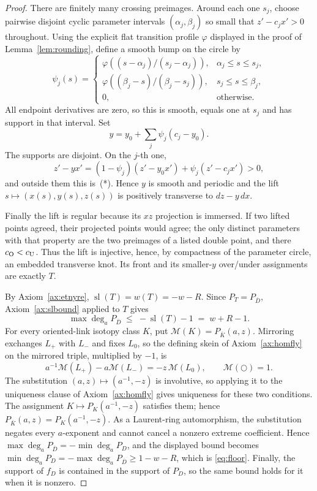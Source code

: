 \begin{proof}
There are finitely many crossing preimages.  Around each one $s_j$, choose
pairwise disjoint cyclic parameter intervals $(\alpha_j,\beta_j)$ so small that
$z'-c_jx'>0$ throughout.  Using the explicit flat transition profile
$\varphi$ displayed in the proof of Lemma~\ref{lem:rounding}, define a smooth
bump on the circle by
\[
 \psi_j(s)=
 \begin{cases}
 \varphi\!\left((s-\alpha_j)/(s_j-\alpha_j)\right),&
       \alpha_j\le s\le s_j,\\
 \varphi\!\left((\beta_j-s)/(\beta_j-s_j)\right),&
       s_j\le s\le\beta_j,\\
 0,&\text{otherwise}.
 \end{cases}
\]
All endpoint derivatives are zero, so this is smooth, equals one at $s_j$ and
has support in that interval.  Set
\[
 y=y_0+\sum_j\psi_j(c_j-y_0).
\]
The supports are disjoint.  On the $j$-th one,
\[
 z'-yx'=(1-\psi_j)(z'-y_0x')+\psi_j(z'-c_jx')>0,
\]
and outside them this is~(*).  Hence $y$ is smooth and periodic and the lift
$s\mapsto(x(s),y(s),z(s))$ is positively transverse to $dz-y\,dx$.

Finally the lift is regular because its $xz$ projection is immersed.  If two
lifted points agreed, their projected points would agree; the only distinct
parameters with that property are the two preimages of a listed double point,
and there $c_{\rm O}<c_{\rm U}$.  Thus the lift is injective, hence, by
compactness of the parameter circle, an embedded transverse knot.  Its front
and its smaller-$y$ over/under assignments are exactly $T$.

By Axiom~\ref{ax:etnyre}, $\operatorname{sl}(T)=w(T)=-w-R$. Since
$P_T=P_{\overline D}$, Axiom~\ref{ax:slbound} applied to $T$ gives
\[
\max\deg_a P_{\overline D}\;\leq\;-\operatorname{sl}(T)-1\;=\;w+R-1 .
\]
For every oriented-link isotopy class $K$, put
$\mathcal M(K)=P_{\overline K}(a,z)$. Mirroring exchanges $L_+$ with $L_-$
and fixes $L_0$, so the defining skein of Axiom~\ref{ax:homfly} on the
mirrored triple, multiplied by $-1$, is
\[
 a^{-1}\mathcal M(L_+)-a\mathcal M(L_-)=-z\,\mathcal M(L_0),
 \qquad \mathcal M(\bigcirc)=1.
\]
The substitution $(a,z)\mapsto(a^{-1},-z)$ is involutive, so applying it to
the uniqueness clause of Axiom~\ref{ax:homfly} gives uniqueness for these two
conditions. The assignment $K\mapsto P_K(a^{-1},-z)$ satisfies them; hence
$P_{\overline K}(a,z)=P_K(a^{-1},-z)$. As a Laurent-ring automorphism, the
substitution negates every $a$-exponent and cannot cancel a nonzero extreme
coefficient. Hence
$\max\deg_a P_{\overline D}=-\min\deg_a P_D$, and the displayed bound becomes
$\min\deg_a P_D=-\max\deg_a P_{\overline D}\geq1-w-R$, which is
\eqref{eq:floor}. Finally, the support of $f_D$ is contained in the support of
$P_D$, so the same bound holds for it when it is nonzero.


\end{proof}
